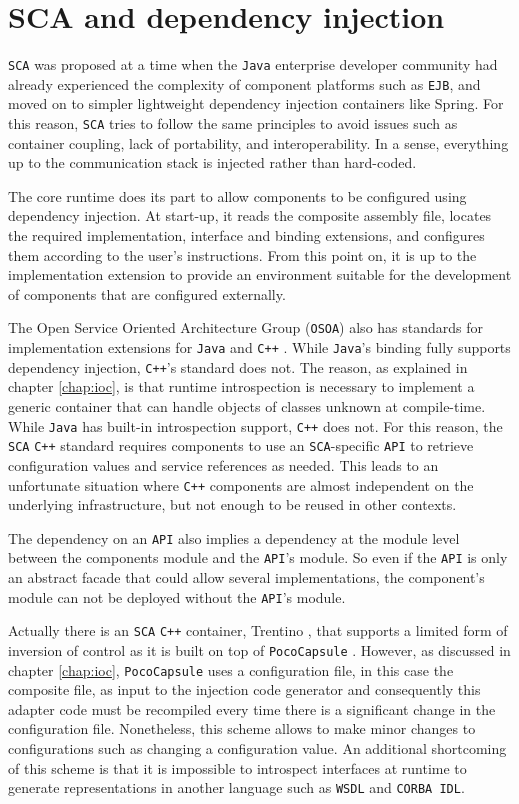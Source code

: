\section{SCA and dependency injection}

\texttt{SCA} was proposed at a time when the \texttt{Java} enterprise developer community had already experienced the complexity of component
platforms such as \texttt{EJB}, and moved on to simpler lightweight dependency injection containers like Spring. For this reason,
\texttt{SCA} tries to follow the same principles to avoid issues such as container coupling, lack of portability, and interoperability.
In a sense, everything up to the communication stack is injected rather than hard-coded.

The core runtime does its part to allow components to be configured using dependency injection. At start-up, it reads the
composite assembly file, locates the required implementation, interface and binding extensions, and configures them
according to the user's instructions. From this point on, it is up to the implementation extension to provide an environment
suitable for the development of components that are configured externally.

The Open Service Oriented Architecture Group (\texttt{OSOA}) also has standards for implementation extensions for \texttt{Java} and \texttt{C++} \cite{SCA}.
While \texttt{Java}'s binding fully supports dependency injection, \texttt{C++}'s standard does not. The reason, as explained in chapter \ref{chap:ioc}, is that runtime
introspection is necessary to implement a generic container that can handle objects of classes unknown at compile-time.
While \texttt{Java} has built-in introspection support, \texttt{C++} does not. For this reason, the \texttt{SCA} \texttt{C++} standard requires components
to use an \texttt{SCA}-specific \texttt{API} to retrieve configuration values and service references as needed. This leads to an unfortunate
situation where \texttt{C++} components are almost independent on the underlying infrastructure, but not enough to be reused in
other contexts.

The dependency on an \texttt{API} also implies a dependency at the module level between the components module and the \texttt{API}'s module.
So even if the \texttt{API} is only an abstract facade that could allow several implementations, the component's module can not be deployed
without the \texttt{API}'s module.

Actually there is an \texttt{SCA} \texttt{C++} container, Trentino \cite{Trentino}, that supports a limited form of inversion of control as it is
built on top of \texttt{PocoCapsule} \cite{PocoCapsule}. However, as discussed in chapter \ref{chap:ioc}, \texttt{PocoCapsule} uses a configuration
file, in this case the composite file, as input to the injection code generator and consequently this adapter code must be
recompiled every time there is a significant change in the configuration file. Nonetheless, this scheme allows to make minor
changes to configurations such as changing a configuration value. An additional shortcoming of this scheme is that
it is impossible to introspect interfaces at runtime to generate representations in another language such as \texttt{WSDL} and \texttt{CORBA IDL}.

